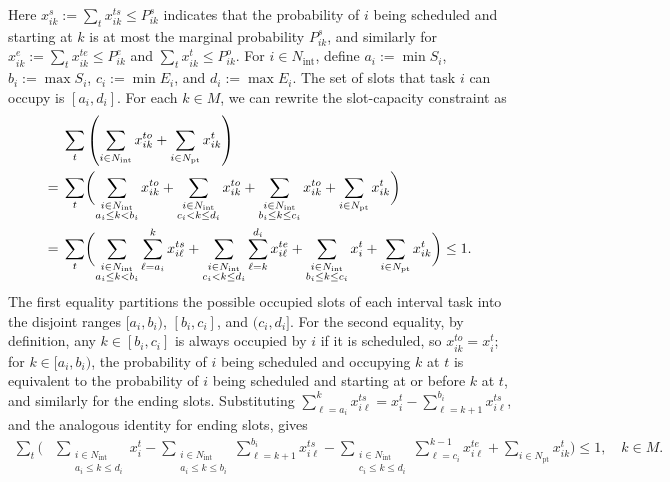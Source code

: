 \documentclass{article}
\begin{document}
Here $x_{ik}^s:=\sum_t x_{ik}^{ts}\leq P_{ik}^s$ indicates that the probability of $i$ being scheduled and starting at $k$ is at most the marginal probability $P_{ik}^s$, and similarly for $x_{ik}^{e}:=\sum_t x_{ik}^{te}\leq P_{ik}^e$ {and $\sum_t x_{ik}^t\leq P^o_{ik}$}.
{For $i\in N_{\mathrm{int}}$, define $a_i:=\min S_i$, $b_i:=\max S_i$, $c_i:=\min E_i$, and $d_i:=\max E_i$. The set of slots that task $i$ can occupy is $[a_i,d_i]$.}
For each $k\in M$, we can rewrite the slot-capacity constraint as
\begin{align}
&\sum_t\left(\sum_{i\in N_{\mathrm{int}}}x_{ik}^{to}+\sum_{i\in N_{\mathrm{pt}}}x_{ik}^t\right)\notag\\
={}&\sum_t\biggl(\sum_{\substack{i\in N_{\mathrm{int}}\\a_i\leq k<b_i}}x_{ik}^{to}
 +\sum_{\substack{i\in N_{\mathrm{int}}\\c_i<k\leq d_i}}x_{ik}^{to}
 +\sum_{\substack{i\in N_{\mathrm{int}}\\b_i\leq k\leq c_i}}x_{ik}^{to}
 +\sum_{i\in N_{\mathrm{pt}}}x_{ik}^t\biggr)\notag\\
={}&\sum_t\biggl(\sum_{\substack{i\in N_{\mathrm{int}}\\a_i\leq k<b_i}}\sum_{\ell=a_i}^k x_{i\ell}^{ts}
 +\sum_{\substack{i\in N_{\mathrm{int}}\\c_i<k\leq d_i}}\sum_{\ell=k}^{d_i}x_{i\ell}^{te}
 +\sum_{\substack{i\in N_{\mathrm{int}}\\b_i\leq k\leq c_i}}x_i^t
 +\sum_{i\in N_{\mathrm{pt}}}x_{ik}^t\biggr)\leq1.\label{eq:1}
\end{align}
{The first equality partitions the possible occupied slots of each interval task into the disjoint ranges $[a_i,b_i)$, $[b_i,c_i]$, and $(c_i,d_i]$.}
For the second equality, by definition, any $k\in [b_i,c_i]$ is always occupied by $i$ if it is scheduled, so $x_{ik}^{to}=x_i^t$; for $k\in[a_i,b_i)$, the probability of $i$ being scheduled and occupying $k$ at $t$ is equivalent to the probability of $i$ being scheduled and starting at or before $k$ at $t$, and similarly for the ending slots.
Substituting $\sum_{\ell=a_i}^k x_{i\ell}^{ts}=x_i^t-\sum_{\ell=k+1}^{b_i}x_{i\ell}^{ts}$, and the analogous identity for ending slots, gives
\begin{equation}\label{eq:2}
\begin{split}
\sum_t\biggl(&\sum_{\substack{i\in N_{\mathrm{int}}\\a_i\leq k\leq d_i}}x_i^t
 -\sum_{\substack{i\in N_{\mathrm{int}}\\a_i\leq k\leq b_i}}\sum_{\ell=k+1}^{b_i}x_{i\ell}^{ts}-\sum_{\substack{i\in N_{\mathrm{int}}\\c_i\leq k\leq d_i}}\sum_{\ell=c_i}^{k-1}x_{i\ell}^{te}
 +\sum_{i\in N_{\mathrm{pt}}}x_{ik}^t\biggr)\leq1,\quad k\in M.
\end{split}
\end{equation}
\end{document}
